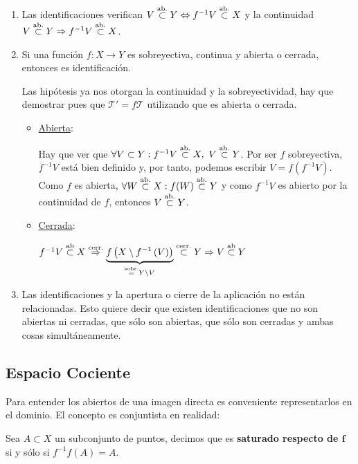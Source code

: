 \begin{obs}
\begin{enumerate}
    \item Las identificaciones verifican $V \stackrel{\text{ab.}}{\subset} Y \Leftrightarrow f^{-1}V \stackrel{\text{ab.}}{\subset} X$ y la continuidad $V \stackrel{\text{ab.}}{\subset} Y \Rightarrow f^{-1}V \stackrel{\text{ab.}}{\subset} X$.

	\item Si una función $f: X \rightarrow Y$ es sobreyectiva, continua y abierta o cerrada, entonces es identificación.
	\begin{demo}
	Las hipótesis ya nos otorgan la continuidad y la sobreyectividad, hay que demostrar pues que $\mathcal{T}' = f\mathcal{T}$ utilizando que es abierta o cerrada.
	\begin{itemize}
		\item \underline{Abierta}:
	
		Hay que ver que $\forall V \subset Y : f^{-1} V \stackrel{\text{ab.}}{\subset} X, \ V \stackrel{\text{ab.}}{\subset} Y$. Por ser $f$ sobreyectiva, $f^{-1}V$ está bien definido y, por tanto, podemos escribir $V=f(f^{-1}V)$. Como $f$ es abierta, $\forall W \stackrel{\text{ab.}}{\subset} X : f(W) \stackrel{\text{ab.}}{\subset} Y$ y como $f^{-1}V$ es abierto por la continuidad de $f$, entonces $V \stackrel{\text{ab.}}{\subset} Y$.
		
		\item \underline{Cerrada}:
		
		$f^{-1}V \stackrel{\text{ab}}{\subset} X \stackrel{\text{cerr.}}{\Rightarrow} \underbrace{f \left( X \setminus f^{-1}\left( V \right) \right)}_{\stackrel{\text{sobr.}}{=} Y\setminus V}  \stackrel{\text{cerr.}}{\subset} Y \Rightarrow V \stackrel{\text{ab}}{\subset} Y$		
	\end{itemize}
	\end{demo}
	
	 \item Las identificaciones y la apertura o cierre de la aplicación no están relacionadas. Esto quiere decir que existen identificaciones que no son abiertas ni cerradas, que sólo son abiertas, que sólo son cerradas y ambas cosas simultáneamente.
\end{enumerate}
\end{obs}


\subsection{Espacio Cociente}
\label{sub:cocientes}
Para entender los abiertos de una imagen directa es conveniente representarlos en el dominio. El concepto es conjuntista en realidad:

\begin{defi}
Sea $A \subset X$ un subconjunto de puntos, decimos que es \textbf{saturado respecto de $\boldsymbol{f}$} si y sólo si $f^{-1}f\left( A \right) = A$.
\end{defi}

